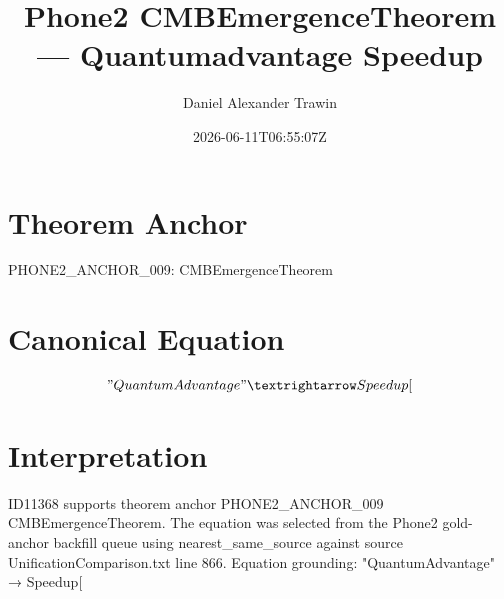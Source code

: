 \documentclass[11pt]{article}
\title{Phone2 CMBEmergenceTheorem — Quantumadvantage Speedup}
\author{Daniel Alexander Trawin}
\date{2026-06-11T06:55:07Z}
\begin{document}
\maketitle
\section*{Theorem Anchor}
PHONE2_ANCHOR_009: CMBEmergenceTheorem
\section*{Canonical Equation}
\[
"QuantumAdvantage" → Speedup[
\]
\section*{Interpretation}
ID11368 supports theorem anchor PHONE2_ANCHOR_009 CMBEmergenceTheorem. The equation was selected from the Phone2 gold-anchor backfill queue using nearest_same_source against source UnificationComparison.txt line 866. Equation grounding: "QuantumAdvantage" → Speedup[
\end{document}
